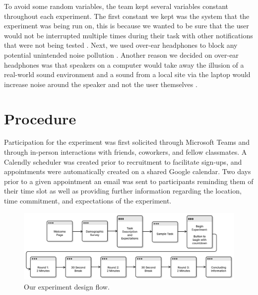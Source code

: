 \documentclass[manuscript,screen,review]{acmart}
\begin{document}
To avoid some random variables, the team kept several variables constant throughout each experiment. The first constant we kept was the system that the experiment was being run on, this is because we wanted to be sure that the user would not be interrupted multiple times during their task with other notifications that were not being tested \cite{1240624.1240730}. Next, we used over-ear headphones to block any potential unintended noise pollution \cite{3316782.3322739}. Another reason we decided on over-ear headphones was that speakers on a computer would take away the illusion of a real-world sound environment and a sound from a local site via the laptop would increase noise around the speaker and not the user themselves \cite{2658861.2658875}.

\section{Procedure}
Participation for the experiment was first solicited through Microsoft Teams and through in-person interactions with friends, coworkers, and fellow classmates. A Calendly scheduler was created prior to recruitment to facilitate sign-ups, and appointments were automatically created on a shared Google calendar. Two days prior to a given appointment an email was sent to participants reminding them of their time slot as well as providing further information regarding the location, time commitment, and expectations of the experiment.

\begin{figure}[h]
  \centering
  \includegraphics[width=\linewidth]{images/experiment-flow1.png}
  \caption{Our experiment design flow.}
\end{figure} 
\end{document}
